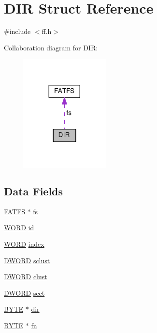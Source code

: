 \hypertarget{structDIR}{\section{D\-I\-R Struct Reference}
\label{structDIR}
}


{\ttfamily \#include $<$ff.\-h$>$}



Collaboration diagram for D\-I\-R\-:\nopagebreak
\begin{figure}[H]
\begin{center}
\leavevmode
\includegraphics[width=128pt]{structDIR__coll__graph}
\end{center}
\end{figure}
\subsection*{Data Fields}
\begin{DoxyCompactItemize}
\item 
\hyperlink{structFATFS}{F\-A\-T\-F\-S} $\ast$ \hyperlink{structDIR_a312eaa66cb703fb2993ea98173dc0c9a}{fs}
\item 
\hyperlink{integer_8h_a197942eefa7db30960ae396d68339b97}{W\-O\-R\-D} \hyperlink{structDIR_aca2c95a99a04173917ec70c030891383}{id}
\item 
\hyperlink{integer_8h_a197942eefa7db30960ae396d68339b97}{W\-O\-R\-D} \hyperlink{structDIR_ab95119fbacbe45e3e9ee0f962b844092}{index}
\item 
\hyperlink{integer_8h_ad342ac907eb044443153a22f964bf0af}{D\-W\-O\-R\-D} \hyperlink{structDIR_a9212af5877b94d790dd3bab3aa320994}{sclust}
\item 
\hyperlink{integer_8h_ad342ac907eb044443153a22f964bf0af}{D\-W\-O\-R\-D} \hyperlink{structDIR_acfbb8ba2d6e73b6f999ceffd1857c190}{clust}
\item 
\hyperlink{integer_8h_ad342ac907eb044443153a22f964bf0af}{D\-W\-O\-R\-D} \hyperlink{structDIR_ad01fcc812ed0dad11a593574336adc9e}{sect}
\item 
\hyperlink{integer_8h_a4ae1dab0fb4b072a66584546209e7d58}{B\-Y\-T\-E} $\ast$ \hyperlink{structDIR_a6c2a8c0cf2d55ae99775e93a16593449}{dir}
\item 
\hyperlink{integer_8h_a4ae1dab0fb4b072a66584546209e7d58}{B\-Y\-T\-E} $\ast$ \hyperlink{structDIR_a32da2f31d6c3b6c42eef981cb0cfd2ee}{fn}
\end{DoxyCompactItemize}


